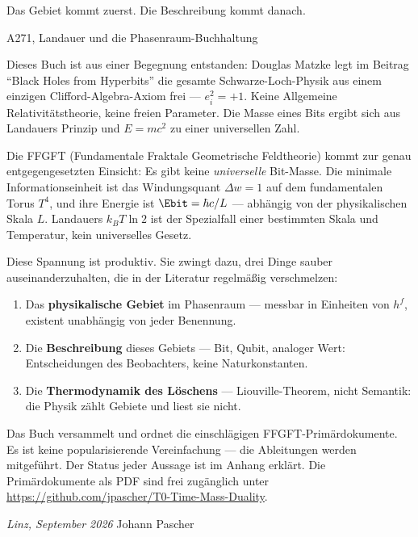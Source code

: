 \epigraph{Das Gebiet kommt zuerst. Die Beschreibung kommt danach.}{A271, Landauer und die Phasenraum-Buchhaltung}

Dieses Buch ist aus einer Begegnung entstanden: Douglas Matzke legt im Beitrag
\enquote{Black Holes from Hyperbits} die gesamte Schwarze-Loch-Physik aus einem
einzigen Clifford-Algebra-Axiom frei --- $e_i^2 = +1$. Keine Allgemeine
Relativitätstheorie, keine freien Parameter. Die Masse eines Bits ergibt sich
aus Landauers Prinzip und $E = mc^2$ zu einer universellen Zahl.

Die FFGFT (Fundamentale Fraktale Geometrische Feldtheorie) kommt zur genau
entgegengesetzten Einsicht: Es gibt keine \emph{universelle} Bit-Masse. Die
minimale Informationseinheit ist das Windungsquant $\Delta w = 1$ auf dem
fundamentalen Torus $T^4$, und ihre Energie ist $\Ebit = \hbar c / L$ ---
abhängig von der physikalischen Skala $L$. Landauers $k_B T \ln 2$ ist der
Spezialfall einer bestimmten Skala und Temperatur, kein universelles Gesetz.

Diese Spannung ist produktiv. Sie zwingt dazu, drei Dinge sauber auseinanderzuhalten,
die in der Literatur regelmäßig verschmelzen:
\begin{enumerate}
  \item Das \textbf{physikalische Gebiet} im Phasenraum --- messbar in Einheiten von
    $h^f$, existent unabhängig von jeder Benennung.
  \item Die \textbf{Beschreibung} dieses Gebiets --- Bit, Qubit, analoger Wert:
    Entscheidungen des Beobachters, keine Naturkonstanten.
  \item Die \textbf{Thermodynamik des Löschens} --- Liouville-Theorem, nicht Semantik:
    die Physik zählt Gebiete und liest sie nicht.
\end{enumerate}

Das Buch versammelt und ordnet die einschlägigen FFGFT-Primärdokumente. Es ist
keine popularisierende Vereinfachung --- die Ableitungen werden mitgeführt. Der
Status jeder Aussage ist im Anhang erklärt. Die Primärdokumente als PDF sind frei
zugänglich unter \url{https://github.com/jpascher/T0-Time-Mass-Duality}.

\bigskip
\noindent
\textit{Linz, September 2026} \hfill Johann Pascher
